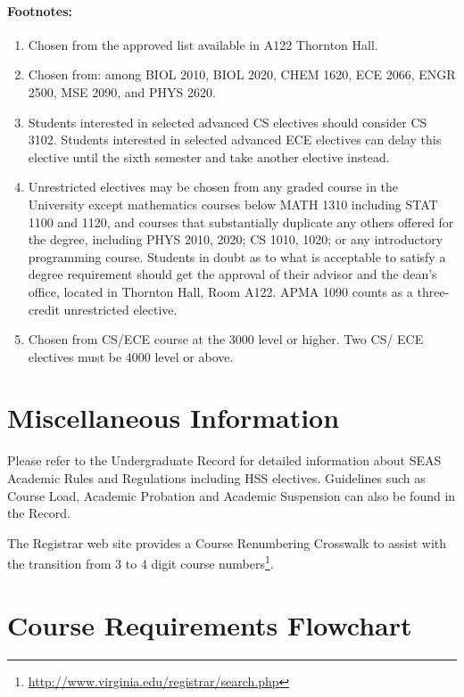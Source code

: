\documentclass[10pt,letter]{book}
\newenvironment{numlist}{
\begin{enumerate}
\setlength{\itemsep}{0pt}
\setlength{\parskip}{0pt}}
{\end{enumerate}}
\newcommand{\mysection}[1]{\section{#1}\renewcommand{\rightmark}{#1}}
\newcommand{\myurl}[1]{\footnote{\scriptsize\url{#1}}}
\begin{document}
\paragraph{Footnotes:}

\begin{numlist}
\item Chosen from the approved list available in A122 Thornton Hall.
\item Chosen from: among BIOL 2010, BIOL 2020, CHEM 1620, ECE 2066, ENGR
  2500, MSE 2090, and PHYS 2620.
\item Students interested in selected advanced CS electives should
  consider CS 3102.  Students interested in selected advanced ECE
  electives can delay this elective until the sixth semester and take
  another elective instead.
\item Unrestricted electives may be chosen from any graded course in
  the University except mathematics courses below MATH 1310 including
  STAT 1100 and 1120, and courses that substantially duplicate any
  others offered for the degree, including PHYS 2010, 2020; CS 1010,
  1020; or any introductory programming course. Students in doubt as
  to what is acceptable to satisfy a degree requirement should get the
  approval of their advisor and the dean's office, located in Thornton
  Hall, Room A122. APMA 1090 counts as a three-credit unrestricted
  elective.
\item Chosen from CS/ECE course at the 3000 level or higher. Two
  CS/ ECE electives must be 4000 level or above.
\end{numlist}


\mysection{Miscellaneous Information}

Please refer to the Undergraduate Record for detailed information
about SEAS Academic Rules and Regulations including HSS
electives. Guidelines such as Course Load, Academic Probation and
Academic Suspension can also be found in the Record.

The Registrar web site provides a Course Renumbering Crosswalk to
assist with the transition from 3 to 4 digit course
numbers\myurl{http://www.virginia.edu/registrar/search.php}.



\clearpage
\mysection{Course Requirements Flowchart}
\end{document}
